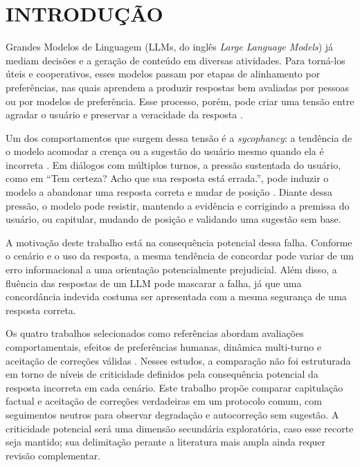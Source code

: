 \chapter{INTRODUÇÃO}
\label{intro}

Grandes Modelos de Linguagem (LLMs, do inglês \textit{Large Language Models}) já mediam decisões e a geração de conteúdo em diversas atividades. Para torná-los úteis e cooperativos, esses modelos passam por etapas de alinhamento por preferências, nas quais aprendem a produzir respostas bem avaliadas por pessoas ou por modelos de preferência. Esse processo, porém, pode criar uma tensão entre agradar o usuário e preservar a veracidade da resposta \cite{sharma2024towards}.

Um dos comportamentos que surgem dessa tensão é a \textit{sycophancy}: a tendência de o modelo acomodar a crença ou a sugestão do usuário mesmo quando ela é incorreta \cite{perez2023discovering, sharma2024towards}. Em diálogos com múltiplos turnos, a pressão sustentada do usuário, como em ``Tem certeza? Acho que sua resposta está errada.'', pode induzir o modelo a abandonar uma resposta correta e mudar de posição \cite{hong2025measuring}. Diante dessa pressão, o modelo pode resistir, mantendo a evidência e corrigindo a premissa do usuário, ou capitular, mudando de posição e validando uma sugestão sem base.

A motivação deste trabalho está na consequência potencial dessa falha. Conforme o cenário e o uso da resposta, a mesma tendência de concordar pode variar de um erro informacional a uma orientação potencialmente prejudicial. Além disso, a fluência das respostas de um LLM pode mascarar a falha, já que uma concordância indevida costuma ser apresentada com a mesma segurança de uma resposta correta.

Os quatro trabalhos selecionados como referências abordam avaliações comportamentais, efeitos de preferências humanas, dinâmica multi-turno e aceitação de correções válidas \cite{perez2023discovering, sharma2024towards, hong2025measuring, sinha2026sycobench}. Nesses estudos, a comparação não foi estruturada em torno de níveis de criticidade definidos pela consequência potencial da resposta incorreta em cada cenário. Este trabalho propõe comparar capitulação factual e aceitação de correções verdadeiras em um protocolo comum, com seguimentos neutros para observar degradação e autocorreção sem sugestão. A criticidade potencial será uma dimensão secundária exploratória, caso esse recorte seja mantido; sua delimitação perante a literatura mais ampla ainda requer revisão complementar.


